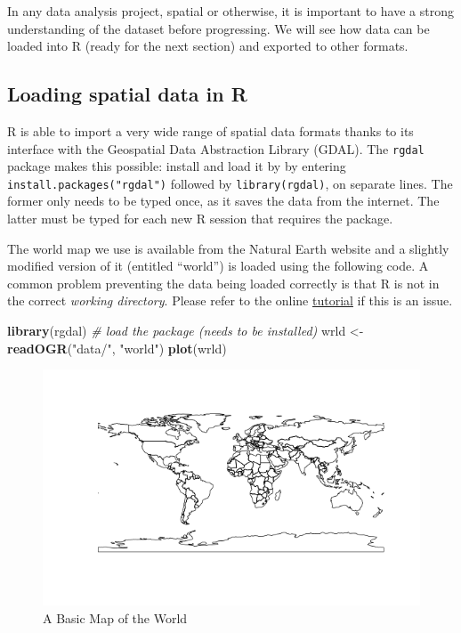 \documentclass[]{article}
\newenvironment{Shaded}{}{}
\newcommand{\KeywordTok}[1]{\textcolor[rgb]{0.00,0.44,0.13}{\textbf{{#1}}}}
\newcommand{\StringTok}[1]{\textcolor[rgb]{0.25,0.44,0.63}{{#1}}}
\newcommand{\CommentTok}[1]{\textcolor[rgb]{0.38,0.63,0.69}{\textit{{#1}}}}
\newcommand{\NormalTok}[1]{{#1}}
\begin{document}
In any data analysis project, spatial or otherwise, it is important to
have a strong understanding of the dataset before progressing. We will
see how data can be loaded into R (ready for the next section) and
exported to other formats.

\subsection{Loading spatial data in R}\label{loading-spatial-data-in-r}

R is able to import a very wide range of spatial data formats thanks to
its interface with the Geospatial Data Abstraction Library (GDAL). The
\texttt{rgdal} package makes this possible: install and load it by by
entering \texttt{install.packages("rgdal")} followed by
\texttt{library(rgdal)}, on separate lines. The former only needs to be
typed once, as it saves the data from the internet. The latter must be
typed for each new R session that requires the package.

The world map we use is available from the Natural Earth website and a
slightly modified version of it (entitled ``world'') is loaded using the
following code. A common problem preventing the data being loaded
correctly is that R is not in the correct \emph{working directory}.
Please refer to the online
\href{https://github.com/geocomPP/sdvwR/blob/master/sdv-tutorial.pdf?raw=true}{tutorial}
if this is an issue.

\begin{Shaded}
\begin{Highlighting}[]
\KeywordTok{library}\NormalTok{(rgdal)  }\CommentTok{# load the package (needs to be installed)}
\NormalTok{wrld <-}\StringTok{ }\KeywordTok{readOGR}\NormalTok{(}\StringTok{"data/"}\NormalTok{, }\StringTok{"world"}\NormalTok{)}
\KeywordTok{plot}\NormalTok{(wrld)}
\end{Highlighting}
\end{Shaded}

\begin{figure}[htbp]
\centering
\includegraphics{figure/A_Basic_Map_of_the_World.png}
\caption{A Basic Map of the World}
\end{figure}
\end{document}
